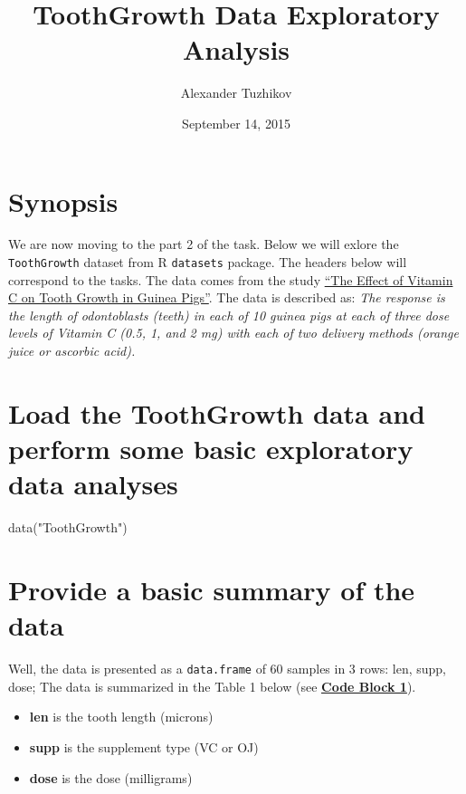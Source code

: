 \documentclass[]{article}
\title{ToothGrowth Data Exploratory Analysis}
\author{Alexander Tuzhikov}
\date{September 14, 2015}
\newenvironment{Shaded}{}{}
\newcommand{\KeywordTok}[1]{\textcolor[rgb]{0.00,0.00,1.00}{{#1}}}
\newcommand{\StringTok}[1]{\textcolor[rgb]{0.00,0.50,0.50}{{#1}}}
\newcommand{\NormalTok}[1]{{#1}}
\providecommand{\tightlist}{%
  \setlength{\itemsep}{0pt}\setlength{\parskip}{0pt}}
\begin{document}
\maketitle

\section{Synopsis}\label{synopsis}

We are now moving to the part 2 of the task. Below we will exlore the
\texttt{ToothGrowth} dataset from R \texttt{datasets} package. The
headers below will correspond to the tasks. The data comes from the
study \href{http://jn.nutrition.org/content/33/5/491.full.pdf}{``The
Effect of Vitamin C on Tooth Growth in Guinea Pigs''}. The data is
described as: \emph{The response is the length of odontoblasts (teeth)
in each of 10 guinea pigs at each of three dose levels of Vitamin C
(0.5, 1, and 2 mg) with each of two delivery methods (orange juice or
ascorbic acid).}

\section{Load the ToothGrowth data and perform some basic exploratory
data
analyses}\label{load-the-toothgrowth-data-and-perform-some-basic-exploratory-data-analyses}

\begin{Shaded}
\begin{Highlighting}[]
\KeywordTok{data}\NormalTok{(}\StringTok{"ToothGrowth"}\NormalTok{)}
\end{Highlighting}
\end{Shaded}

\section{Provide a basic summary of the
data}\label{provide-a-basic-summary-of-the-data}

Well, the data is presented as a \texttt{data.frame} of 60 samples in 3
rows: len, supp, dose; The data is summarized in the Table 1 below (see
\textbf{\hyperref[code-block-1]{Code Block 1}}).

\begin{itemize}
\tightlist
\item
  \textbf{len} is the tooth length (microns)
\item
  \textbf{supp} is the supplement type (VC or OJ)
\item
  \textbf{dose} is the dose (milligrams)
\end{itemize}
\end{document}
